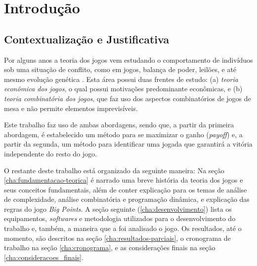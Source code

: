 \chapter[Introdução]{Introdução}
\label{introduc}

\section{Contextualização e Justificativa}

Por alguns anos a teoria dos jogos vem estudando o comportamento de
indivíduos sob uma situação de conflito, como em jogos, balança de
poder, leilões, e até mesmo evolução
genética \cite{sartini_IIbienaldasbm}. Esta área possui duas frentes de
estudo: (a) \emph{teoria econômica dos jogos}, o qual possui motivações
predominante econômicas, e (b) \emph{teoria combinatória dos jogos}, que
faz uso dos aspectos combinatórios de jogos de mesa e não permite
elementos imprevisíveis.

Este trabalho faz uso de ambas abordagens, sendo que, a partir da
primeira abordagem, é estabelecido um método para se maximizar o ganho
(\emph{payoff}) e, a partir da segunda, um método para identificar uma
jogada que garantirá a vitória independente do resto do jogo.

O restante deste trabalho está organizado da seguinte maneira: Na seção
\ref{cha:fundamentacao-teorica} é narrado uma breve
história da teoria dos jogos e seus conceitos fundamentais, além de
conter explicação para os temas de análise de complexidade, análise
combinatória e programação dinâmica, e explicação das regras do jogo
\emph{Big Points}. A seção seguinte (\ref{cha:desenvolvimento}) lista os
equipamentos, \textit{softwares} e metodologia utilizados para o desenvolvimento
do trabalho e, também, a maneira que a foi analisado o jogo. Os resultados,
até o momento, são descritos na seção \ref{cha:resultados-parciais}, o
cronograma de trabalho na seção \ref{cha:cronograma}, e as considerações
finais na seção \ref{cha:consideracoes_finais}.
